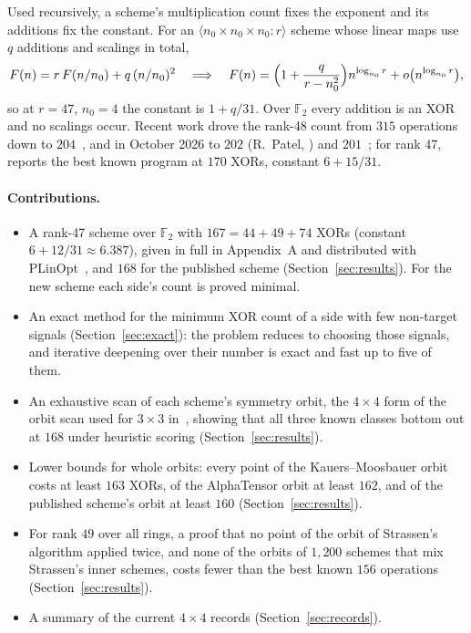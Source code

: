 \documentclass[11pt]{article}
\theoremstyle{remark}
\newcommand{\F}{\mathbb{F}}
\begin{document}
Used recursively, a scheme's multiplication count fixes the exponent
and its additions fix the constant.  For an
$\langle n_0\times n_0\times n_0:r\rangle$ scheme whose linear maps use
$q$ additions and scalings in total,
\[
F(n) = r\,F(n/n_0) + q\,(n/n_0)^2
\quad\Longrightarrow\quad
F(n) = \Bigl(1+\frac{q}{r-n_0^2}\Bigr)n^{\log_{n_0} r} + o\bigl(n^{\log_{n_0} r}\bigr),
\]
so at $r=47$, $n_0=4$ the constant is $1+q/31$.  Over $\F_2$ every
addition is an XOR and no scalings occur.  Recent work drove the
rank-48 count from $315$ operations~\cite{DPS25} down to
$204$~\cite{DPSST26}, and in October 2026 to $202$ (R.~Patel,
\cite{PLinOpt,Patel26}) and $201$~\cite{Sidebottom26c}; for rank $47$,
\cite{DPSST26} reports the best known program at $170$ XORs, constant
$6+15/31$.

\paragraph{Contributions.}
\begin{itemize}
\item A rank-47 scheme over $\F_2$ with $167=44+49+74$ XORs (constant
  $6+12/31\approx6.387$), given in full in Appendix~A and distributed
  with PLinOpt~\cite{PLinOpt}, and $168$ for the published scheme
  (Section~\ref{sec:results}).  For the new scheme each side's count is
  proved minimal.
\item An exact method for the minimum XOR count of a side with few
  non-target signals (Section~\ref{sec:exact}): the problem reduces to
  choosing those signals, and iterative deepening over their number is
  exact and fast up to five of them.
\item An exhaustive scan of each scheme's symmetry orbit, the $4\times4$
  form of the orbit scan used for $3\times3$ in~\cite{Sidebottom26a},
  showing that all three known classes bottom out at $168$ under
  heuristic scoring (Section~\ref{sec:results}).
\item Lower bounds for whole orbits: every point of the
  Kauers--Moosbauer orbit costs at least $163$ XORs, of the AlphaTensor
  orbit at least $162$, and of the published scheme's orbit at least
  $160$ (Section~\ref{sec:results}).
\item For rank $49$ over all rings, a proof that no point of the orbit
  of Strassen's algorithm applied twice, and none of the orbits of
  $1{,}200$ schemes that mix Strassen's inner schemes, costs fewer than
  the best known $156$ operations (Section~\ref{sec:results}).
\item A summary of the current $4\times4$ records
  (Section~\ref{sec:records}).
\end{itemize}
\end{document}

